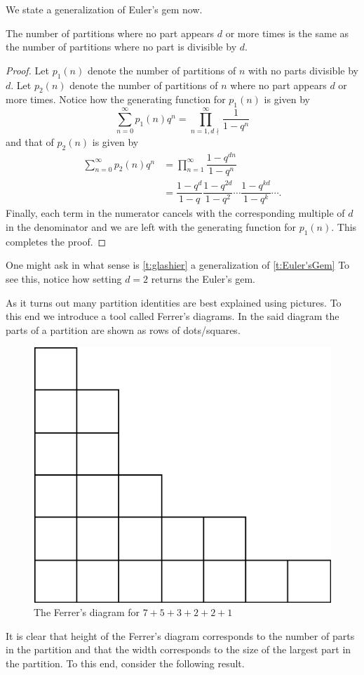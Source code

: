 We state a generalization of Euler's gem now. 
\begin{theorem}
The number of partitions where no part appears $d$ or more times is the same as the number of partitions where no part is divisible by $d$.
\label{t:glashier}
\end{theorem}
\begin{proof}
Let $p_1(n)$ denote the number of partitions of $n$ with no parts divisible by $d$. Let $p_2(n)$ denote the number of partitions of $n$ where no part appears $d$ or more times. Notice how the generating function for $p_1(n)$ is given by \[
\sum_{n=0}^{\infty}p_1(n)q^n = \prod_{n=1, d\nmid}^{\infty}\dfrac{1}{1-q^n}
\]
and that of $p_2(n)$ is given by 
\begin{align*}
\sum_{n=0}^{\infty}p_2(n)q^n &= \prod_{n=1}^{\infty}\dfrac{1-q^{dn}}{1-q^n} \\
&= \dfrac{1-q^d}{1-q}\dfrac{1-q^{2d}}{1-q^2}\cdots\dfrac{1-q^{kd}}{1-q^k}\cdots.
\end{align*}
Finally, each term in the numerator cancels with the corresponding multiple of $d$ in the denominator and we are left with the generating function for $p_1(n)$. This completes the proof.
\end{proof}
\begin{remark}
One might ask in what sense is \cref{t:glashier} a generalization of \cref{t:Euler'sGem} To see this, notice how setting $d=2$ returns the Euler's gem.  
\end{remark}
As it turns out many partition identities are best explained using pictures. To this end we introduce a tool called Ferrer's diagrams. In the said diagram the parts of a partition are shown as rows of dots/squares. 
\begin{figure}[H]
    \centering
    \includegraphics[width=0.5\linewidth]{Images/Figure17.png}
    \caption{The Ferrer's diagram for $7+5+3+2+2+1$}
\end{figure}
It is clear that height of the Ferrer's diagram corresponds to the number of parts in the partition and that the width corresponds to the size of the largest part in the partition. To this end, consider the following result. 
